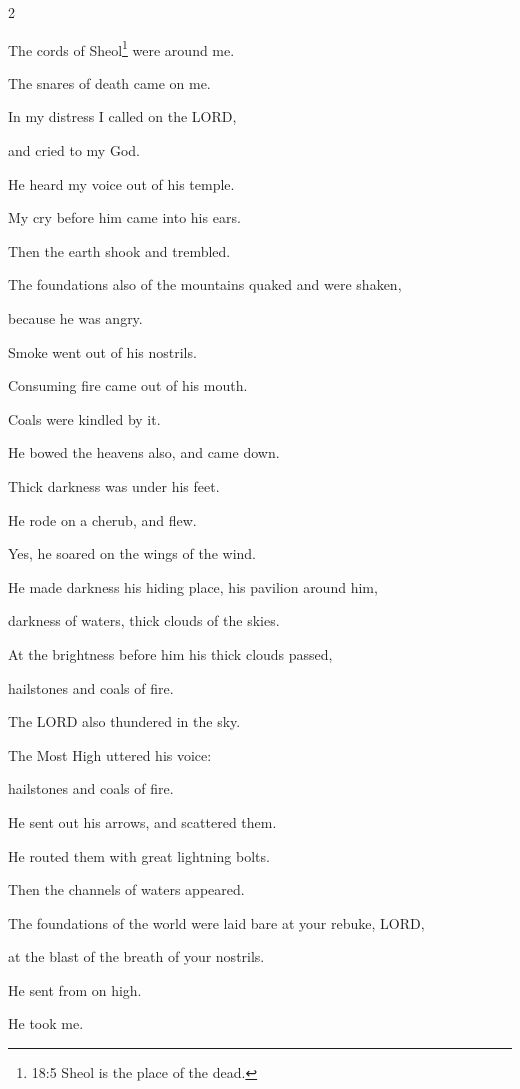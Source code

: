 \begin{multicols}{2}
	
	\myverse{}The cords of Sheol\footnote{18:5 Sheol is the place of the dead.} were around me.
	
	The snares of death came on me.
	
	
	\myverse{}In my distress I called on the LORD,
	
	and cried to my God.
	
	He heard my voice out of his temple.
	
	My cry before him came into his ears.
	
	
	\myverse{}Then the earth shook and trembled.
	
	The foundations also of the mountains quaked and were shaken,
	
	because he was angry.
	
	
	\myverse{}Smoke went out of his nostrils.
	
	Consuming fire came out of his mouth.
	
	Coals were kindled by it.
	
	
	\myverse{}He bowed the heavens also, and came down.
	
	Thick darkness was under his feet.
	
	
	\myverse{}He rode on a cherub, and flew.
	
	Yes, he soared on the wings of the wind.
	
	
	\myverse{}He made darkness his hiding place, his pavilion around him,
	
	darkness of waters, thick clouds of the skies.
	
	
	\myverse{}At the brightness before him his thick clouds passed,
	
	hailstones and coals of fire.
	
	
	\myverse{}The LORD also thundered in the sky.
	
	The Most High uttered his voice:
	
	hailstones and coals of fire.
	
	
	\myverse{}He sent out his arrows, and scattered them.
	
	He routed them with great lightning bolts.
	
	
	\myverse{}Then the channels of waters appeared.
	
	The foundations of the world were laid bare at your rebuke, LORD,
	
	at the blast of the breath of your nostrils.
	
	
	\myverse{}He sent from on high.
	
	He took me.
	

\end{multicols}
